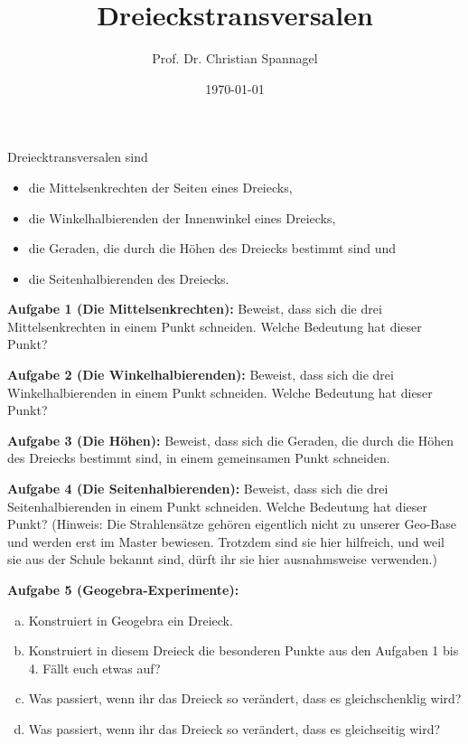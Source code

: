 \documentclass{../cssheet}
\title{Dreieckstransversalen}
\author{Prof. Dr. Christian Spannagel}
\date{\today}
\begin{document}
\printtitle

Dreiecktransversalen sind
\begin{itemize}
\item die Mittelsenkrechten der Seiten eines Dreiecks,
\item die Winkelhalbierenden der Innenwinkel eines Dreiecks,
\item die Geraden, die durch die Höhen des Dreiecks bestimmt sind und
\item die Seitenhalbierenden des Dreiecks.
\end{itemize}

\textbf{Aufgabe 1 (Die Mittelsenkrechten):}  Beweist, dass sich die drei Mittelsenkrechten in einem Punkt schneiden. Welche Bedeutung hat dieser Punkt?

\textbf{Aufgabe 2 (Die Winkelhalbierenden):}  Beweist, dass sich die drei Winkelhalbierenden in einem Punkt schneiden. Welche Bedeutung hat dieser Punkt?

\textbf{Aufgabe 3 (Die Höhen):}  Beweist, dass sich die Geraden, die durch die Höhen des Dreiecks bestimmt sind, in einem gemeinsamen Punkt schneiden.

\textbf{Aufgabe 4 (Die Seitenhalbierenden):}  Beweist, dass sich die drei Seitenhalbierenden in einem Punkt schneiden. Welche Bedeutung hat dieser Punkt? (Hinweis: Die Strahlensätze gehören eigentlich nicht zu unserer Geo-Base und werden erst im Master bewiesen. Trotzdem sind sie hier hilfreich, und weil sie aus der Schule bekannt sind, dürft ihr sie hier ausnahmsweise verwenden.)

\textbf{Aufgabe 5 (Geogebra-Experimente):} 
\begin{enumerate}[a)]
\item Konstruiert in Geogebra ein Dreieck.
\item Konstruiert in diesem Dreieck die besonderen Punkte aus den Aufgaben 1 bis 4. Fällt euch etwas auf?
\item Was passiert, wenn ihr das Dreieck so verändert, dass es gleichschenklig wird?
\item Was passiert, wenn ihr das Dreieck so verändert, dass es gleichseitig wird?
\end{enumerate}

\vspace*{10mm}
\printlicense

\printsocials

\end{document}
